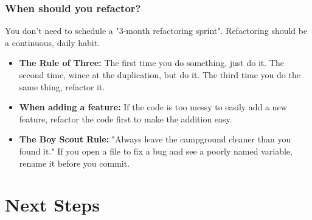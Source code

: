 \documentclass[xcolor=table]{beamer}
\begin{document}
\begin{frame}
    \frametitle{When should you refactor?}
    You don't need to schedule a "3-month refactoring sprint". Refactoring should be a continuous, daily habit.
    
    \vspace{0.3cm}
    \begin{itemize}
        \item \textbf{The Rule of Three:} The first time you do something, just do it. The second time, wince at the duplication, but do it. The third time you do the same thing, refactor it.
        \item \textbf{When adding a feature:} If the code is too messy to easily add a new feature, refactor the code first to make the addition easy.
        \item \textbf{The Boy Scout Rule:} "Always leave the campground cleaner than you found it." If you open a file to fix a bug and see a poorly named variable, rename it before you commit.
    \end{itemize}
\end{frame}

\section{Next Steps}

    
\end{document}
